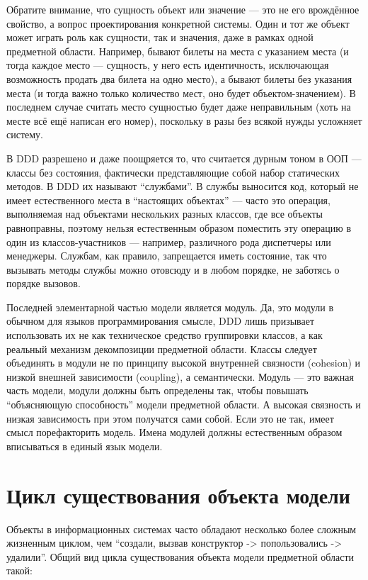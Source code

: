 \documentclass{../../text-style}
\begin{document}
Обратите внимание, что сущность объект или значение --- это не его врождённое свойство, а вопрос проектирования конкретной системы. Один и тот же объект может играть роль как сущности, так и значения, даже в рамках одной предметной области. Например, бывают билеты на места с указанием места (и тогда каждое место --- сущность, у него есть идентичность, исключающая возможность продать два билета на одно место), а бывают билеты без указания места (и тогда важно только количество мест, оно будет объектом-значением). В последнем случае считать место сущностью будет даже неправильным (хоть на месте всё ещё написан его номер), поскольку в разы без всякой нужды усложняет систему.

В DDD разрешено и даже поощряется то, что считается дурным тоном в ООП --- классы без состояния, фактически представляющие собой набор статических методов. В DDD их называют ``службами''. В службы выносится код, который не имеет естественного места в ``настоящих объектах'' --- часто это операция, выполняемая над объектами нескольких разных классов, где все объекты равноправны, поэтому нельзя естественным образом поместить эту операцию в один из классов-участников --- например, различного рода диспетчеры или менеджеры. Службам, как правило, запрещается иметь состояние, так что вызывать методы службы можно отовсюду и в любом порядке, не заботясь о порядке вызовов.

Последней элементарной частью модели является модуль. Да, это модули в обычном для языков программирования смысле, DDD лишь призывает использовать их не как техническое средство группировки классов, а как реальный механизм декомпозиции предметной области. Классы следует объединять в модули не по принципу высокой внутренней связности (cohesion) и низкой внешней зависимости (coupling), а семантически. Модуль --- это важная часть модели, модули должны быть определены так, чтобы повышать ``объясняющую способность'' модели предметной области. А высокая связность и низкая зависимость при этом получатся сами собой. Если это не так, имеет смысл порефакторить модель. Имена модулей должны естественным образом вписываться в единый язык модели.

\section{Цикл существования объекта модели}

Объекты в информационных системах часто обладают несколько более сложным жизненным циклом, чем ``создали, вызвав конструктор -> попользовались -> удалили''. Общий вид цикла существования объекта модели предметной области такой:
\end{document}
